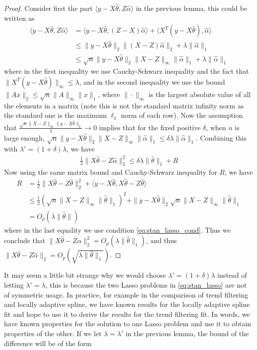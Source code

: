 \documentclass[a4paper]{article}
\newcommand{\ra}{\rangle}
\newcommand{\la}{\langle}
\begin{document}
\begin{proof}
Consider first the part $\la y-X\hat{\theta}, Z\hat{\alpha}\ra$ in the previous lemma, this could be written as
\begin{align*}
\la y - X\hat{\theta}, Z\hat{\alpha}\ra &= \la y-X\hat{\theta}, (Z-X)\hat{\alpha}\ra + \la X^T(y-X\hat{\theta}), \hat{\alpha}\ra\\
&\leq \|y-X\hat{\theta}\|_2\|(X-Z)\hat{\alpha}\|_2 + \lambda\|\hat{\alpha}\|_1\\
&\leq \sqrt{n}\|y-X\hat{\theta}\|_2\|X-Z\|_\infty\|\hat{\alpha}\|_1 + \lambda\|\hat{\alpha}\|_1
\end{align*}
where in the first inequality we use Cauchy-Schwarz inequality and the fact that $\|X^T(y-X\hat{\theta})\|_\infty\leq \lambda$, and in the second inequality we use the bound $\|Ax\|_2\leq \sqrt{n}\|A\|_\infty\|x\|_1$, where $\|\cdot\|_\infty$ is the largest absolute value of all the elements in a matrix (note this is not the standard matrix infinity norm as the standard one is the maximum $\ell_1$ norm of each row). Now the assumption that $\frac{\sqrt{n}\|X-Z\|_\infty\|y-X\hat{\theta}\|_2}{\lambda} \rightarrow 0$ implies that for the fixed positive $\delta$, when $n$ is large enough, $\sqrt{n}\|y-X\hat{\theta}\|_2\|X-Z\|_\infty\|\hat{\alpha}\|_1\leq \delta\lambda\|\hat{\alpha}\|_1$. Combining this with $\lambda' = (1+\delta)\lambda$, we have
\begin{align*}
\frac{1}{2}\|X\hat{\theta} - Z\hat{\alpha}\|_2^2 \leq \delta\lambda\|\hat{\theta}\|_1 + R
\end{align*}
Now using the same matrix bound and Cauchy-Schwarz inequality for $R$, we have
\begin{align*}
R &= \frac{1}{2}\|X\hat{\theta}-Z\hat{\theta}\|_2^2 + \la y-X\hat{\theta}, X\hat{\theta} - Z\hat{\theta}\ra\\
&\leq \frac{1}{2}(\sqrt{n}\|X-Z\|_\infty\|\hat{\theta}\|_1)^2 + \|y-X\hat{\theta}\|_2\sqrt{n}\|X-Z\|_\infty\|\hat{\theta}\|_1\\
&= O_p(\lambda\|\hat{\theta}\|)
\end{align*}
where in the last equality we use condition \eqref{eq:stan_lasso_cond}. Thus we conclude that $\|X\hat{\theta}-Z\hat{\alpha}\|_2^2 = O_p(\lambda\|\hat{\theta}\|_1)$, and thus $\|X\hat{\theta} - Z\hat{\alpha}\|_2 = O_p(\sqrt{\lambda\|\hat{\theta}\|_1})$.  
\end{proof}

It may seem a little bit strange why we would choose $\lambda' = (1+\delta)\lambda$ instead of letting $\lambda' = \lambda$, this is because the two Lasso problems in \eqref{eq:stan_lasso} are not of symmetric usage. In practice, for example in the comparison of trend filtering and locally adaptive spline, we have known results for the locally adaptive spline fit and hope to use it to derive the results for the trend filtering fit. In words, we have known properties for the solution to one Lasso problem and use it to obtain properties of the other. If we let $\lambda = \lambda'$ in the previous lemma, the bound of the difference will be of the form
\end{document}
